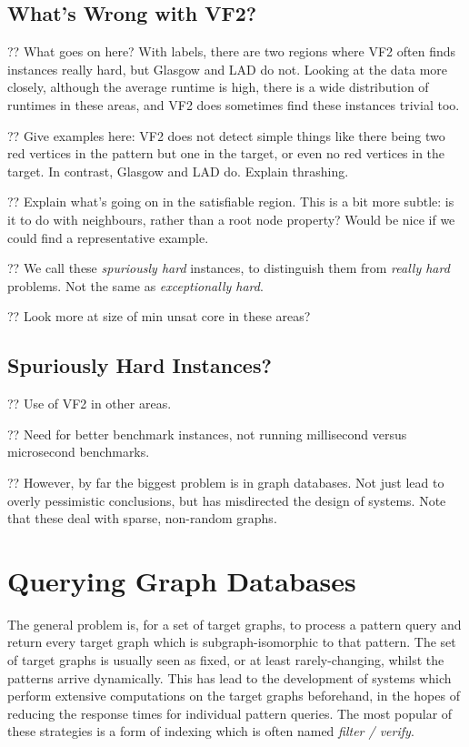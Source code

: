 \documentclass[twoside,11pt]{article}
\begin{document}
\subsection{What's Wrong with VF2?}

?? What goes on here? With labels, there are two regions where VF2 often finds instances really
hard, but Glasgow and LAD do not. Looking at the data more closely, although the average runtime is
high, there is a wide distribution of runtimes in these areas, and VF2 does sometimes find these
instances trivial too.

?? Give examples here: VF2 does not detect simple things like there being two red vertices in the
pattern but one in the target, or even no red vertices in the target. In contrast, Glasgow and LAD
do. Explain thrashing.

?? Explain what's going on in the satisfiable region. This is a bit more subtle: is it to do with
neighbours, rather than a root node property? Would be nice if we could find a representative
example.

?? We call these \emph{spuriously hard} instances, to distinguish them from \emph{really hard}
problems. Not the same as \emph{exceptionally hard}.

?? Look more at size of min unsat core in these areas?

\subsection{Spuriously Hard Instances?}

?? Use of VF2 in other areas.

?? Need for better benchmark instances, not running millisecond versus microsecond benchmarks.

?? However, by far the biggest problem is in graph databases. Not just lead to overly pessimistic
conclusions, but has misdirected the design of systems. Note that these deal with sparse, non-random
graphs.

\section{Querying Graph Databases}\label{section:filterverify}

The general problem is, for a set of target graphs, to process a pattern query and return every
target graph which is subgraph-isomorphic to that pattern. The set of target graphs is usually seen
as fixed, or at least rarely-changing, whilst the patterns arrive dynamically. This has lead to the
development of systems which perform extensive computations on the target graphs beforehand, in the
hopes of reducing the response times for individual pattern queries. The most popular of these
strategies is a form of indexing which is often named \emph{filter / verify}.
\end{document}
